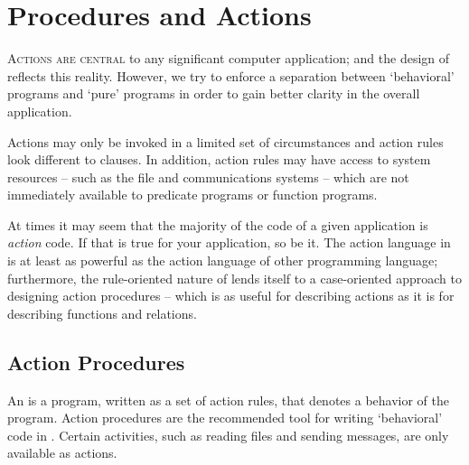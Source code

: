 \chapter{Procedures and Actions}
\label{actions}
\lettrine[findent=-0.1em,nindent=0.2em]{A}{ctions are central} to any significant computer application; and the design of \go reflects this reality. However, we try to enforce a separation between `behavioral' programs and `pure' programs in order to gain better clarity in the overall application. 

Actions may only be invoked in a limited set of circumstances and action rules look different to clauses. In addition, action rules may have access to system resources -- such as the file and communications systems -- which are not immediately available to predicate programs or function programs.

\begin{aside}
At times it may seem that the majority of the code of a given application is \emph{action} code. If that is true for your application, so be it. The action language in \go is at least as powerful as the action language of other programming language; furthermore, the rule-oriented nature of \go lends itself to a case-oriented approach to designing action procedures -- which is as useful for describing actions as it is for describing functions and relations.
\end{aside}

\section{Action Procedures}
\label{procedure}
An  is a program, written as a set of action rules, that denotes a behavior of the program. Action procedures are the recommended tool for writing `behavioral' code in \go. Certain activities, such as reading files and sending messages, are only available as actions. 

